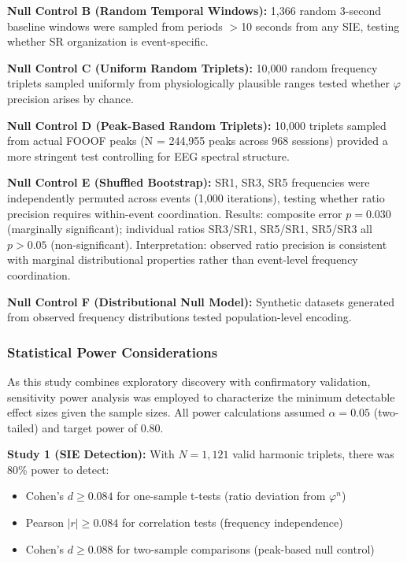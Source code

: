 \documentclass[11pt,a4paper]{article}
\newcommand{\phisym}{\varphi}
\begin{document}
\textbf{Null Control B (Random Temporal Windows):} 1,366 random 3-second baseline windows were sampled from periods $>$10 seconds from any SIE, testing whether SR organization is event-specific.

\textbf{Null Control C (Uniform Random Triplets):} 10,000 random frequency triplets sampled uniformly from physiologically plausible ranges tested whether $\phisym$ precision arises by chance.

\textbf{Null Control D (Peak-Based Random Triplets):} 10,000 triplets sampled from actual FOOOF peaks (N = 244,955 peaks across 968 sessions) provided a more stringent test controlling for EEG spectral structure.

\textbf{Null Control E (Shuffled Bootstrap):} SR1, SR3, SR5 frequencies were independently permuted across events (1,000 iterations), testing whether ratio precision requires within-event coordination. Results: composite error $p = 0.030$ (marginally significant); individual ratios SR3/SR1, SR5/SR1, SR5/SR3 all $p > 0.05$ (non-significant). Interpretation: observed ratio precision is consistent with marginal distributional properties rather than event-level frequency coordination.

\textbf{Null Control F (Distributional Null Model):} Synthetic datasets generated from observed frequency distributions tested population-level encoding.

\subsubsection{Statistical Power Considerations}

As this study combines exploratory discovery with confirmatory validation, sensitivity power analysis was employed to characterize the minimum detectable effect sizes given the sample sizes. All power calculations assumed $\alpha = 0.05$ (two-tailed) and target power of 0.80.

\textbf{Study 1 (SIE Detection):} With $N = 1,121$ valid harmonic triplets, there was 80\% power to detect:
\begin{itemize}
    \item Cohen's $d \geq 0.084$ for one-sample t-tests (ratio deviation from $\phisym^n$)
    \item Pearson $|r| \geq 0.084$ for correlation tests (frequency independence)
    \item Cohen's $d \geq 0.088$ for two-sample comparisons (peak-based null control)
\end{itemize}
\end{document}
